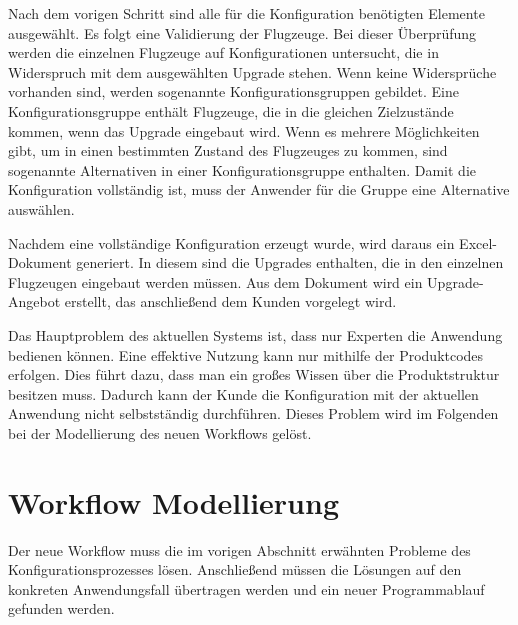 Nach dem vorigen Schritt sind alle für die Konfiguration benötigten Elemente ausgewählt. Es folgt eine Validierung der Flugzeuge. Bei dieser Überprüfung werden die einzelnen Flugzeuge auf Konfigurationen untersucht, die in Widerspruch mit dem ausgewählten Upgrade stehen. Wenn keine Widersprüche vorhanden sind, werden sogenannte Konfigurationsgruppen gebildet. Eine Konfigurationsgruppe enthält Flugzeuge, die in die gleichen Zielzustände kommen, wenn das Upgrade eingebaut wird. Wenn es mehrere Möglichkeiten gibt, um in einen bestimmten Zustand des Flugzeuges zu kommen, sind sogenannte Alternativen in einer Konfigurationsgruppe enthalten. Damit die Konfiguration vollständig ist, muss der Anwender für die Gruppe eine Alternative auswählen. \par

Nachdem eine vollständige Konfiguration erzeugt wurde, wird daraus ein Excel-Dokument generiert. In diesem sind die Upgrades enthalten, die in den einzelnen Flugzeugen eingebaut werden müssen. Aus dem Dokument wird ein Upgrade-Angebot erstellt, das anschließend dem Kunden vorgelegt wird. \par 

Das Hauptproblem des aktuellen Systems ist, dass nur Experten die Anwendung bedienen können. Eine effektive Nutzung kann nur mithilfe der Produktcodes erfolgen. Dies führt dazu, dass man ein großes Wissen über die Produktstruktur besitzen muss. Dadurch kann der Kunde die Konfiguration mit der aktuellen Anwendung nicht selbstständig durchführen. Dieses Problem wird im Folgenden bei der Modellierung des neuen Workflows gelöst.

\section{Workflow Modellierung}\label{workflow_modelling}
Der neue Workflow muss die im vorigen Abschnitt erwähnten Probleme des Konfigurationsprozesses lösen.  Anschließend müssen die Lösungen auf den konkreten Anwendungsfall übertragen werden und ein neuer Programmablauf gefunden werden.

